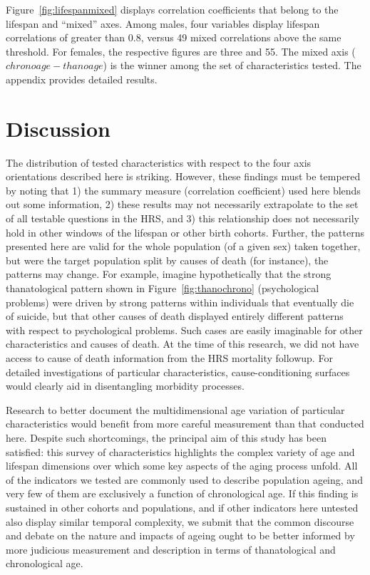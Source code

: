 \documentclass[11pt,oneside]{article} %
\begin{document}
\begin{figure}[!h]
{\begin{subfigure}{.7\textwidth}
	\end{subfigure}
	}
	
\end{figure}

Figure~\ref{fig:lifespanmixed} displays correlation coefficients
that belong to the lifespan and ``mixed'' axes. Among males, four variables
display lifespan correlations of greater than 0.8, versus 49 mixed correlations above
the same threshold. For females, the respective figures are three and 55. The
mixed axis ($chrono age - thano age$) is the winner among the set of
characteristics tested. The appendix provides detailed results. 

\section*{Discussion}
The distribution of tested characteristics with respect to the
four axis orientations described here is striking. However, these findings
must be tempered by noting that 1) the summary measure (correlation coefficient)
used here blends out some information, 2) these results may
not necessarily extrapolate to the set of all testable questions in the HRS, and 3) this relationship does not necessarily hold in other windows of the lifespan or other birth cohorts. Further, the patterns
presented here are valid for the whole population (of a given sex) taken
together, but were the target population split by causes of death (for
instance), the patterns may change. For example, imagine hypothetically that the
strong thanatological pattern shown in Figure~\ref{fig:thanochrono}
(psychological problems) were driven by strong patterns within individuals that
eventually die of suicide, but that other causes of death displayed entirely different patterns with respect to
psychological problems. Such cases are easily imaginable for other
characteristics and causes of death. At the time of this research, we did not
have access to cause of death information from the HRS mortality followup. For
detailed investigations of particular characteristics, cause-conditioning
surfaces would clearly aid in disentangling morbidity processes.

Research to better document the multidimensional age variation of particular
characteristics would benefit from more careful measurement than that conducted
here.
Despite such shortcomings, the principal aim of this study has been satisfied:
this survey of characteristics highlights the complex variety of age and
lifespan dimensions over which some key aspects of the aging process unfold. All
of the indicators we tested are commonly used to describe population ageing, and
very few of them are exclusively a function of chronological age. If this
finding is sustained in other cohorts and populations, and if other indicators
here untested also display similar temporal complexity, we submit that the
common discourse and debate on the nature and impacts of ageing ought to be
better informed by more judicious measurement and description in terms of
thanatological and chronological age.
\end{document}
